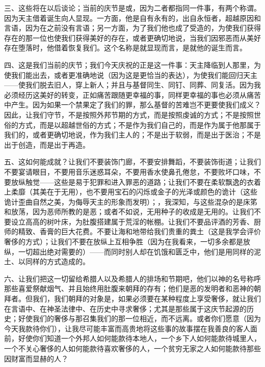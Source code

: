 三、这些将在以后谈论；当前的庆节是或，因为二者都指同一件事，有两个称谓。因为天主借着诞生向人显现。一方面，他是自有永有的，出自永恒者，超越原因和言语，因为在之前没有言语；另一方面，为了我们他也成了受造的，为使我们获得存在的那一位也使我们获得美好的存在，或者更确切地说，当我们因邪恶而从美好存在堕落时，他借着恢复我们。这个名称是就显现而言，是就他的诞生而言。\par

四、这是我们当前的庆节；我们今天庆祝的正是这一件事：天主降临到人那里，为使我们能出去，或者更准确地说（因为这是更恰当的表达），为使我们能回归天主——使我们脱去旧人，穿上新人；并且与基督同生、同钉、同葬、同复活。因为我必须经历这美好的转变，正如痛苦跟随更幸福的事，同样更幸福的事也必须从痛苦中产生。因为如果一个禁果定了我们的罪，那么基督的苦难岂不更要使我们成义？因此，让我们守节，不是按照外邦节期的方式，而是按照虔诚的方式；不是按照世俗的方式，而是以超越世俗的方式；不是作为我们自己的，而是作为属于他那属于我们的，或者更确切地说，作为我们主人的；不是出于软弱，而是出于医治；不是出于创造，而是出于再造。\par

五、这如何能成就？让我们不要装饰门廊，不要安排舞蹈，不要装饰街道；让我们不要宴请眼目，不要用音乐迷惑耳朵，不要用香水使鼻孔倦怠，不要败坏口味，不要放纵触觉——这些是易于犯罪和进入罪恶的道路；让我们不要在柔软飘逸的衣着上柔靡（其美在于无用），也不要用宝石的闪烁或金子的光泽或颜色的诡计（这些诡计歪曲自然之美，为侮辱天主的形象而发明）；，我深知，与这些混杂的是床笫和放荡，因为恶师所教的是恶；或者不如说，无用种子的收成是无用的。让我们不要设立高高的树叶床，为肚腹搭建属于荒淫的帐棚。让我们不要品评酒的芳香、厨师的精致、香膏的巨大花费。不要让海和地带给我们贵重的粪土（这是我学会评价奢侈的方式）；让我们不要在放纵上互相争胜（因为在我看来，一切多余都是放纵，一切超出绝对需要的）——而同时别人却在饥饿和匮乏中，他们是用同样的泥土、以同样的方式造成的。\par

六、让我们把这一切留给希腊人以及希腊人的排场和节期吧，他们以神的名号称呼那些喜爱祭献烟气、并且始终用肚腹来朝拜的存有；他们是恶的发明者和恶神的朝拜者。但我们，我们朝拜的对象是，如果必须要在某种程度上享受奢侈，就让我们在言语中、在神圣法律中、在历史中寻求奢侈；尤其是那些属于这庆节起源的历史；好使我们的奢侈与那召集我们的那一位相近，而不远离。或者你们愿意（因为今天我款待你们），让我尽可能丰富而高贵地将这些事的故事摆在我善良的客人面前，好使你们知道一个外邦人如何能款待本地人，一个乡下人如何能款待城里人，一个不关心奢侈的人如何能款待喜欢奢侈的人，一个贫穷无家之人如何能款待那些因财富而显赫的人？\par


